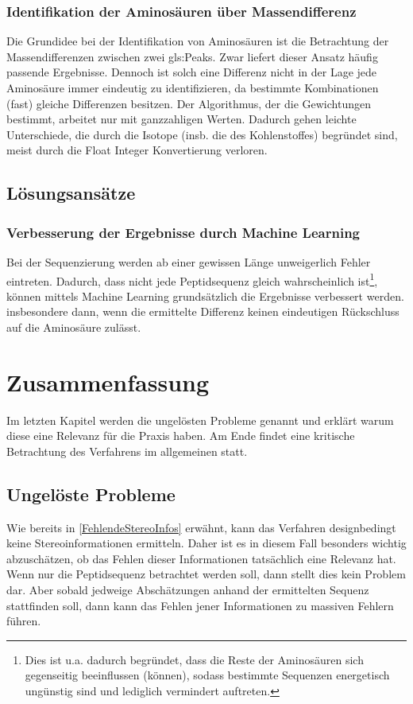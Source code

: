\documentclass[a4paper, 12pt]{article}
\begin{document}
\subsubsection{Identifikation der Aminosäuren über Massendifferenz}
Die Grundidee bei der Identifikation von Aminosäuren ist die Betrachtung der Massendifferenzen zwischen zwei \glspl{gls:Peak}. Zwar liefert dieser Ansatz häufig passende Ergebnisse. Dennoch ist solch eine Differenz nicht in der Lage jede Aminosäure immer eindeutig zu identifizieren, da bestimmte Kombinationen (fast) gleiche Differenzen besitzen. Der Algorithmus, der die Gewichtungen bestimmt, arbeitet nur mit ganzzahligen Werten. Dadurch gehen leichte Unterschiede, die durch die Isotope (insb. die des Kohlenstoffes) begründet sind, meist durch die Float Integer Konvertierung verloren.

\subsection{Lösungsansätze}
\subsubsection{Verbesserung der Ergebnisse durch Machine Learning}
Bei der Sequenzierung werden ab einer gewissen Länge unweigerlich Fehler eintreten.\cite[S.621,Figure 5]{pNovoPlus} Dadurch, dass nicht jede Peptidsequenz gleich wahrscheinlich ist\footnote{Dies ist u.a. dadurch begründet, dass die Reste der Aminosäuren sich gegenseitig beeinflussen (können), sodass bestimmte Sequenzen energetisch ungünstig sind und lediglich vermindert auftreten.}, können mittels Machine Learning grundsätzlich die Ergebnisse verbessert werden. insbesondere dann, wenn die ermittelte Differenz keinen eindeutigen Rückschluss auf die Aminosäure zulässt.

\section{Zusammenfassung}
Im letzten Kapitel werden die ungelösten Probleme genannt und erklärt warum diese eine Relevanz für die Praxis haben. Am Ende findet eine kritische Betrachtung des Verfahrens im allgemeinen statt.

\subsection{Ungelöste Probleme}
Wie bereits in \ref{FehlendeStereoInfos} erwähnt, kann das Verfahren designbedingt keine Stereoinformationen ermitteln. Daher ist es in diesem Fall besonders wichtig abzuschätzen, ob das Fehlen dieser Informationen tatsächlich eine Relevanz hat. Wenn nur die Peptidsequenz betrachtet werden soll, dann stellt dies kein Problem dar. Aber sobald jedweige Abschätzungen anhand der ermittelten Sequenz stattfinden soll, dann kann das Fehlen jener Informationen zu massiven Fehlern führen.\\
\end{document}

